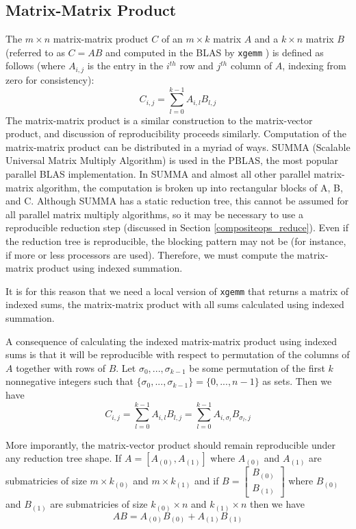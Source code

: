 \subsection{Matrix-Matrix Product}
  \label{sec:compositeops_gemm}
  The $m \times n$ matrix-matrix product $C$ of an $m \times k$ matrix $A$ and a $k \times n$ matrix $B$(referred to as $C = AB$ and computed in the BLAS by \texttt{xgemm} \cite{BLAS}) is defined as follows (where $A_{i, j}$ is the entry in the $i^{th}$ row and $j^{th}$ column of $A$, indexing from zero for consistency):
  \[
    C_{i, j} = \sum\limits_{l = 0}^{k - 1} A_{i, l}B_{l, j}
  \]
  The matrix-matrix product is a similar construction to the matrix-vector product, and discussion of reproducibility proceeds similarly.
  Computation of the matrix-matrix product can be distributed in a myriad of ways. SUMMA (Scalable Universal Matrix Multiply Algorithm) is used in the PBLAS, the most popular parallel BLAS implementation. In SUMMA and almost all other parallel matrix-matrix algorithm, the computation is broken up into rectangular blocks of A, B, and C. Although SUMMA has a static reduction tree, this cannot be assumed for all parallel matrix multiply algorithms, so it may be necessary to use a reproducible reduction step (discussed in Section \ref{compositeops_reduce}).
  Even if the reduction tree is reproducible, the blocking pattern may not be (for instance, if more or less processors are used). Therefore, we must compute the matrix-matrix product using indexed summation.

  It is for this reason that we need a local version of \texttt{xgemm} that returns a matrix of indexed sums, the matrix-matrix product with all sums calculated using indexed summation.

  A consequence of calculating the indexed matrix-matrix product using indexed sums is that it will be reproducible with respect to permutation of the columns of $A$ together with rows of $B$.
  Let $\sigma_0, ..., \sigma_{k - 1}$ be some permutation of the first $k$ nonnegative integers such that $\{\sigma_0, ..., \sigma_{k - 1}\} = \{0, ..., n - 1\}$ as sets. Then we have
  \[
    C_{i, j} = \sum\limits_{l = 0}^{k - 1} A_{i, l}B_{l, j} = \sum\limits_{l = 0}^{k - 1} A_{i, \sigma_l}B_{\sigma_l, j}
  \]

  More imporantly, the matrix-vector product should remain reproducible under any reduction tree shape.
  If $A = [A_{(0)}, A_{(1)}]$ where $A_{(0)}$ and $A_{(1)}$ are submatricies of size $m \times k_{(0)}$ and $m \times k_{(1)}$ and if $B = \left[\begin{array}{c}B_{(0)}\\ B_{(1)}\end{array}\right]$ where $B_{(0)}$ and $B_{(1)}$ are submatricies of size $k_{(0)} \times n$ and $k_{(1)} \times n$ then we have 
  \[
    AB = A_{(0)}B_{(0)} + A_{(1)}B_{(1)}
  \]

